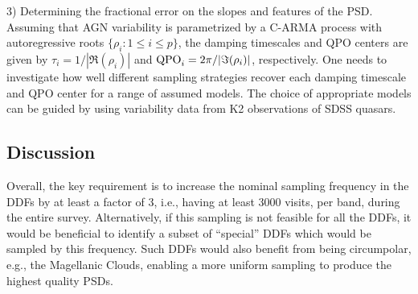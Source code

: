 3) Determining the fractional error on the slopes and features of the PSD.
Assuming that AGN variability is parametrized by a C-ARMA process with
autoregressive roots $\{\rho_{i}:1 \leq i \leq p\}$, the damping timescales and
QPO centers are given by $\tau_{i} = 1/|\Re(\rho_{i})|$ and ${\rm QPO}_{i} =
2\pi/|\Im(\rho_{i})|$, respectively. One needs to investigate how well different
sampling strategies recover each damping timescale and QPO center for a range of
assumed models. The choice of appropriate models can be guided by using
variability data from K2 observations of SDSS quasars.

%
%
%
%

\subsection{Discussion}
\label{sec:\secname:discussion}


Overall, the key requirement is to increase the nominal sampling
frequency in the DDFs by at least a factor of 3, i.e., having at least
3000 visits, per band, during the entire survey. Alternatively, if this
sampling is not feasible for all the DDFs, it would be beneficial to
identify a subset of ``special'' DDFs which would be sampled by this
frequency. Such DDFs would also benefit from being circumpolar, e.g.,
the Magellanic Clouds, enabling a more uniform sampling to produce the
highest quality PSDs.

